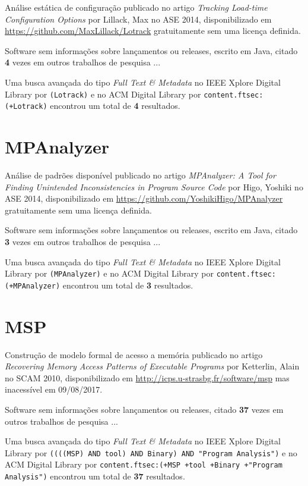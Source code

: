 Análise estática de configuração
publicado no artigo {\it Tracking Load-time Configuration Options}
por Lillack, Max
no ASE 2014,
disponibilizado em \url{https://github.com/MaxLillack/Lotrack}
gratuitamente
sem uma licença definida.

Software sem informações sobre lançamentos ou releases,
escrito em Java,
citado {\bf 4} vezes em outros trabalhos de pesquisa ...

Uma busca avançada do tipo {\it Full Text \& Metadata} no IEEE Xplore Digital Library por
\texttt{(Lotrack)}
e no ACM Digital Library por
\texttt{content.ftsec:(+Lotrack)}
encontrou um total de
{\bf 4}
resultados.

\section{MPAnalyzer}

Análise de padrões disponível
publicado no artigo {\it MPAnalyzer: A Tool for Finding Unintended Inconsistencies in Program Source Code}
por Higo, Yoshiki
no ASE 2014,
disponibilizado em \url{https://github.com/YoshikiHigo/MPAnalyzer}
gratuitamente
sem uma licença definida.

Software sem informações sobre lançamentos ou releases,
escrito em Java,
citado {\bf 3} vezes em outros trabalhos de pesquisa ...

Uma busca avançada do tipo {\it Full Text \& Metadata} no IEEE Xplore Digital Library por
\texttt{(MPAnalyzer)}
e no ACM Digital Library por
\texttt{content.ftsec:(+MPAnalyzer)}
encontrou um total de
{\bf 3}
resultados.

\section{MSP}

Construção de modelo formal de acesso a memória
publicado no artigo {\it Recovering Memory Access Patterns of Executable Programs}
por Ketterlin, Alain
no SCAM 2010,
disponibilizado em \url{http://icps.u-strasbg.fr/software/msp}
mas inacessível em 09/08/2017.

Software sem informações sobre lançamentos ou releases,
citado {\bf 37} vezes em outros trabalhos de pesquisa ...

Uma busca avançada do tipo {\it Full Text \& Metadata} no IEEE Xplore Digital Library por
\texttt{((((MSP) AND tool) AND Binary) AND "Program Analysis")}
e no ACM Digital Library por
\texttt{content.ftsec:(+MSP +tool +Binary +"Program Analysis")}
encontrou um total de
{\bf 37}
resultados.

